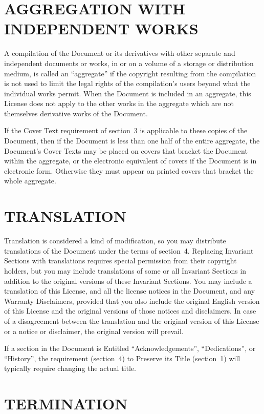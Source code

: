 \section{AGGREGATION WITH INDEPENDENT WORKS}

A compilation of the Document or its derivatives with other separate
and independent documents or works, in or on a volume of a storage or
distribution medium, is called an ``aggregate'' if the copyright
resulting from the compilation is not used to limit the legal rights
of the compilation's users beyond what the individual works permit.
When the Document is included in an aggregate, this License does not
apply to the other works in the aggregate which are not themselves
derivative works of the Document.

If the Cover Text requirement of section~3 is applicable to these
copies of the Document, then if the Document is less than one half of
the entire aggregate, the Document's Cover Texts may be placed on
covers that bracket the Document within the aggregate, or the
electronic equivalent of covers if the Document is in electronic form.
Otherwise they must appear on printed covers that bracket the whole
aggregate.


\section{TRANSLATION}

Translation is considered a kind of modification, so you may
distribute translations of the Document under the terms of section~4.
Replacing Invariant Sections with translations requires special
permission from their copyright holders, but you may include
translations of some or all Invariant Sections in addition to the
original versions of these Invariant Sections.  You may include a
translation of this License, and all the license notices in the
Document, and any Warranty Disclaimers, provided that you also include
the original English version of this License and the original versions
of those notices and disclaimers.  In case of a disagreement between
the translation and the original version of this License or a notice
or disclaimer, the original version will prevail.

If a section in the Document is Entitled ``Acknowledgements'',
``Dedications'', or ``History'', the requirement (section~4) to Preserve
its Title (section~1) will typically require changing the actual
title.


\section{TERMINATION}

